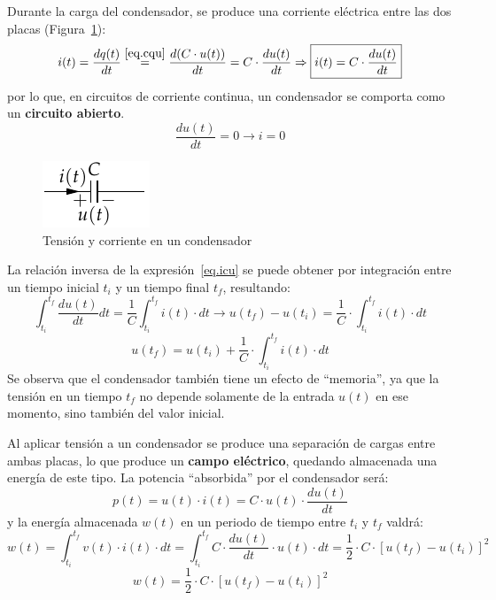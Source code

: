	Durante la carga del condensador, se produce una corriente
        eléctrica entre las dos placas (Figura~\ref{fig:condensador}):
	\begin{equation}\label{eq.icu}
          i(t)=\dfrac{dq(t)}{dt}\stackrel{\eqref{eq.cqu}}{=}\dfrac{d(C\cdot u(t))}{dt}=C\cdot \dfrac{du(t)}{dt} \Rightarrow \boxed{i(t)=C\cdot \dfrac{du(t)}{dt}}
	\end{equation}
	por lo que, en circuitos de corriente continua, un condensador
        se comporta como un \textbf{circuito abierto}.
	\begin{equation*}
          \frac{du(t)}{dt} = 0 \rightarrow i = 0
	\end{equation*}
	\begin{figure}[H]
          \centering
          \includegraphics[width=0.15\linewidth]{../figs/Condensador.pdf}
          \caption{Tensión y corriente en un condensador}
          \label{fig:condensador}
	\end{figure}
	
	La relación inversa de la expresión~\eqref{eq.icu} se puede
        obtener por integración entre un tiempo inicial $t_i$ y un
        tiempo final $t_f$, resultando:
	\begin{equation*}
          \int_{t_i}^{t_f} \dfrac{du(t)}{dt}dt=\dfrac{1}{C}\int_{t_i}^{t_f}i(t)\cdot dt \rightarrow u(t_f)-u(t_i)=\dfrac{1}{C}\cdot\int_{t_i}^{t_f} i(t)\cdot dt
	\end{equation*}
	\begin{equation}\label{eq.u_C}
          \boxed{u(t_f)=u(t_i)+\dfrac{1}{C}\cdot\int_{t_i}^{t_f} i(t)\cdot dt}
	\end{equation}
	Se observa que el condensador también tiene un efecto de
        ``memoria'', ya que la tensión en un tiempo $t_f$ no depende
        solamente de la entrada $u(t)$ en ese momento, sino también
        del valor inicial.
	
	Al aplicar tensión a un condensador se produce una separación
        de cargas entre ambas placas, lo que produce un \textbf{campo
          eléctrico}, quedando almacenada una energía de este tipo. La
        potencia ``absorbida'' por el condensador será:
	\begin{equation*}
          p(t)=u(t)\cdot i(t)=C\cdot u(t)\cdot\dfrac{du(t)}{dt}
	\end{equation*}
	y la energía almacenada $w(t)$ en un periodo de tiempo entre
        $t_i$ y $t_f$ valdrá:
	\begin{equation*}
          w(t)=\int_{t_i}^{t_f}v(t)\cdot i(t)\cdot dt=\int_{t_i}^{t_f}C\cdot\dfrac{du(t)}{dt}\cdot u(t)\cdot dt=\dfrac{1}{2}\cdot C\cdot [u(t_f)-u(t_i)]^2
	\end{equation*}
	\begin{equation}
          \boxed{w(t)=\dfrac{1}{2}\cdot C\cdot [u(t_f)-u(t_i)]^2}
	\end{equation}


